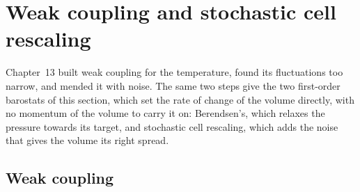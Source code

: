 \section{Weak coupling and stochastic cell rescaling}
\label{sec:pr-rescaling}

Chapter~13 built weak coupling for the temperature, found its
fluctuations too narrow, and mended it with noise. The same two steps
give the two first-order barostats of this section, which set the rate of
change of the volume directly, with no momentum of the volume to carry
it on: Berendsen's, which
relaxes the pressure towards its target, and stochastic cell rescaling,
which adds the noise that gives the volume its right spread.

\subsection*{Weak coupling}

